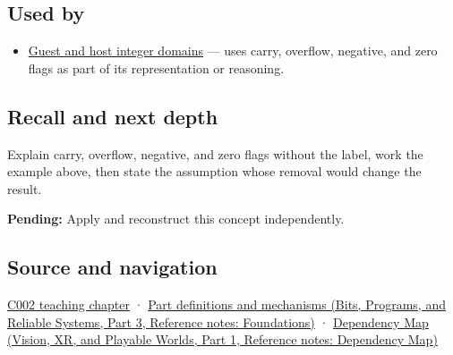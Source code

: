 \subsection{Used by}\label{appendix-8d687c9c08ab-used-by}

\hypertarget{appendix-8d687c9c08ab-used-by}{}

\begin{itemize}
\tightlist
\item
  \hyperref[appendix-33e7a011b684]{Guest and host integer domains} --- uses carry, overflow, negative, and zero flags as part of its representation or reasoning.
\end{itemize}

\subsection{Recall and next depth}\label{appendix-8d687c9c08ab-recall-and-next-depth}

\hypertarget{appendix-8d687c9c08ab-recall-and-next-depth}{}

Explain carry, overflow, negative, and zero flags without the label, work the example above, then state the assumption whose removal would change the result.

\textbf{Pending:} Apply and reconstruct this concept independently.

\subsection{Source and navigation}\label{appendix-8d687c9c08ab-source-and-navigation}

\hypertarget{appendix-8d687c9c08ab-source-and-navigation}{}

\hyperref[01-foundations-i-ch001-arithmetic-becomes-a-policy]{C002 teaching chapter} · \href{../01-Bits-Programs-and-Reliable-Systems-P03/main.pdf\#appendix-fd090d982a15}{Part definitions and mechanisms (Bits, Programs, and Reliable Systems, Part 3, Reference notes: Foundations)} · \href{../07-Vision-XR-and-Playable-Worlds-P01/main.pdf\#appendix-4ad47bdd269a}{Dependency Map (Vision, XR, and Playable Worlds, Part 1, Reference notes: Dependency Map)}
